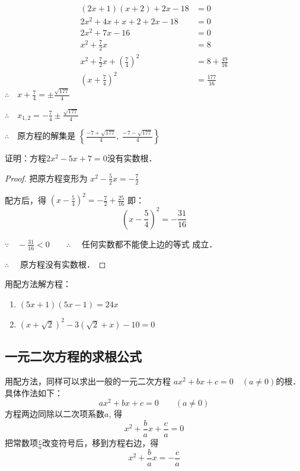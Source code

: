 \begin{solution}
\begin{align*}
    (2x+1)(x+2)+2x-18&=0\\
    2x^2+4x+x+2+2x-18&=0  \tag{去括号}\\
    2x^2+7x-16&=0  \tag{合并}\\
x^2+\frac{7}{2}x&=8  \tag{两边除以2}\\
x^2+\frac{7}{2}x+\left(\frac{7}{4}\right)^2&=8+\frac{49}{16} \tag{配方}\\
\left(x+\frac{7}{4}\right)^2&=\frac{177}{16}
\end{align*}    
$\therefore\quad x+\frac{7}{4}=\pm\frac{\sqrt{177}}{4}$

$\therefore\quad x_{1,2}=-\frac{7}{4}\pm\frac{\sqrt{177}}{4}$

$\therefore\quad $原方程的解集是 $\left\{\frac{-7+\sqrt{177}}{4},\; \frac{-7-\sqrt{177}}{4}\right\}$
\end{solution}




\begin{example}
    证明：方程$2x^2-5x+7=0$没有实数根．
\end{example}

\begin{proof}
    把原方程变形为
    $x^2-\frac{5}{2}x=-\frac{7}{2}$

    配方后，得
    $\left(x-\frac{5}{4}\right)^2=-\frac{7}{2}+\frac{25}{16}$
    即：
    \[\left(x-\frac{5}{4}\right)^2=-\frac{31}{16} \]
    
    $\because\quad -\frac{31}{16}<0 \qquad \therefore\quad $
    任何实数都不能使上边的等式
    成立．
    
    $ \therefore\quad $ 原方程没有实数根．
\end{proof}

\begin{ex}
    用配方法解方程：
    \begin{enumerate}
        \item $(5x+1)(5x-1)=24x$
        \item $(x+\sqrt{2})^2-3(\sqrt{2}+x)-10=0$
    \end{enumerate}
\end{ex}

\subsection{一元二次方程的求根公式}
用配方法，同样可以求出一般的一元二次方程
$ax^2+bx+c=0\quad (a\ne 0)$的根．具体作法如下：
$$ax^2+bx+c=0\qquad (a\ne 0)$$
方程两边同除以二次项系数$a$, 得
$$x^2+\frac{b}{a}x+\frac{c}{a}=0$$
把常数项$\frac{c}{a}$改变符号后，移到方程右边，得
\[x^2+\frac{b}{a}x=-\frac{c}{a}\]

